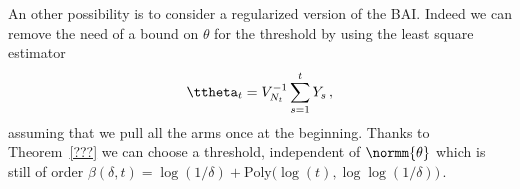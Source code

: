 An other possibility is to consider a regularized version of the BAI. Indeed we can remove the need of a bound on $\theta$ for the threshold by using the least square estimator
\[
\ttheta_t = V_{N_t}^{-1} \sum_{s=1}^t Y_s\,,
\]
assuming that we pull all the arms once at the beginning. Thanks to Theorem~\ref{???} we can choose a threshold, independent of $\normm{\theta}$ which is still of order $\beta(\delta,t) = \log(1/\delta) + \text{Poly}\big(\log(t),\log\log(1/\delta)\big)$\,.
